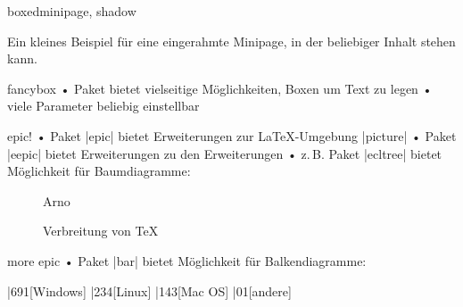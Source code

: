 \begin{frame}[fragile]{boxedminipage, shadow}
\begin{LTXexample}
\begin{boxedminipage}[t]{10em}
Ein kleines Beispiel für eine eingerahmte Minipage, in der beliebiger Inhalt stehen kann.
\end{boxedminipage}
\end{LTXexample}
\begin{LTXexample}
\end{LTXexample}
\end{frame}

\begin{frame}[fragile]{fancybox}
• Paket  bietet vielseitige Möglichkeiten, Boxen um Text zu legen
• viele Parameter beliebig einstellbar
\•
\begin{LTXexample}
\end{LTXexample}
\end{frame}

\begin{frame}[fragile]{epic!}
• Paket |epic| bietet Erweiterungen zur \LaTeX-Umgebung |picture|
• Paket |eepic| bietet Erweiterungen zu den Erweiterungen
• z.\,B. Paket |ecltree| bietet Möglichkeit für Baumdiagramme:
\•
\begin{figure}
\begin{bundle}{Arno}
\end{bundle}
\caption{Verbreitung von \TeX}
\end{figure}
\end{frame}

\begin{frame}[fragile]{more epic}
• Paket |bar| bietet Möglichkeit für Balkendiagramme:
\•
\begin{LTXexample}[preset=\vspace*{1cm},pos=b]
\begin{barenv}
\bar{69}{1}[Windows]
\bar{23}{4}[Linux]
\bar{14}{3}[Mac OS]
\bar{0}{1}[andere]
\end{barenv}
\end{LTXexample}


\end{frame}

